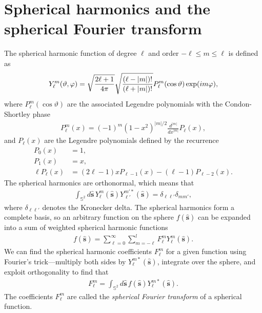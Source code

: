 \documentclass[]{osa-article}
\let\originalleft\left
\let\originalright\right
\renewcommand{\left}{\mathopen{}\mathclose\bgroup\originalleft}
\renewcommand{\right}{\aftergroup\egroup\originalright}
\providecommand{\mh}[1]{\mathbf{\hat{#1}}}
\providecommand{\mbb}[1]{\mathbb{#1}}
\begin{document}
\section{Spherical harmonics and the spherical Fourier transform}\label{sec:sph}
The spherical harmonic function of degree $\ell$ and order $-\ell \leq m \leq \ell$
is defined as \cite{schaeffer2013}
\begin{align}
Y_\ell^m(\vartheta, \varphi) = \sqrt{\frac{2\ell+1}{4\pi}}\sqrt{\frac{(\ell-|m|)!}{(\ell+|m|)!}}P_\ell^m\left(\cos\vartheta\right)\exp(i m \varphi),
\end{align}
where $P_\ell^m(\cos\vartheta)$ are the associated Legendre polynomials with the
Condon-Shortley phase
\begin{align}
  P_\ell^m(x) = (-1)^m(1-x^2)^{|m|/2}\frac{d^{|m|}}{dx^{|m|}}P_\ell(x),
\end{align}
and $P_\ell(x)$ are the Legendre polynomials defined by the recurrence
\begin{align}
  P_0(x) &= 1,\\
  P_1(x) &= x,\\
  \ell P_\ell(x) &= (2\ell-1)xP_{\ell-1}(x) - (\ell-1)P_{\ell-2}(x). 
\end{align}
The spherical harmonics are orthonormal, which means that
\begin{align}
  \int_{\mbb{S}^2}d\mh{s}\, Y_\ell^m(\mh{s}){Y}_{\ell'}^{m'*}(\mh{s}) = \delta_{\ell\ell'}\delta_{mm'},
\end{align}
where $\delta_{\ell\ell'}$ denotes the Kronecker delta. The spherical harmonics form a
complete basis, so an arbitrary function on the sphere $f(\mh{s})$ can be
expanded into a sum of weighted spherical harmonic functions
\begin{align}
  f(\mh{s}) = \sum_{\ell=0}^{\infty}\sum_{m=-\ell}^{l}F_\ell^mY_\ell^m(\mh{s}).
\end{align}
We can find the spherical harmonic coefficients $F_\ell^m$ for a given function
using Fourier's trick---multiply both sides by $Y_\ell^{m*}(\mh{s})$,
integrate over the sphere, and exploit orthogonality to find that
\begin{align}
  F_\ell^m = \int_{\mbb{S}^2}d\mh{s}\, f(\mh{s})Y_\ell^{m*}(\mh{s}).
\end{align}
The coefficients $F_\ell^m$ are called the \textit{spherical Fourier transform}
of a spherical function.
\end{document}

